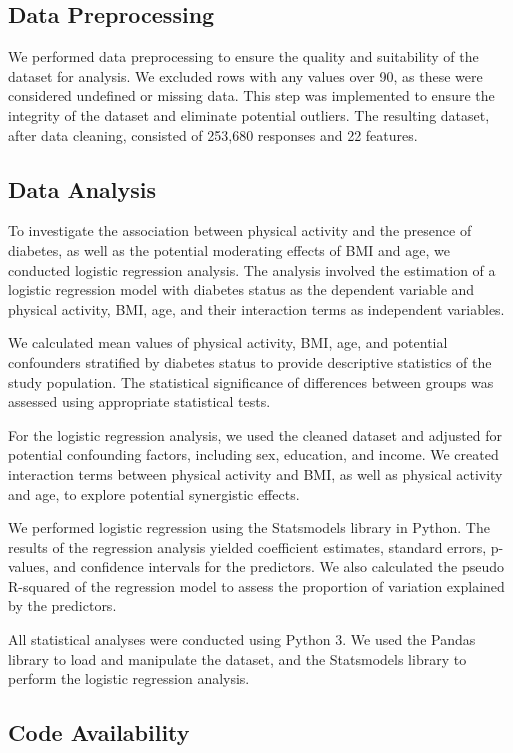 \documentclass[11pt]{article}
\begin{document}
\subsection*{Data Preprocessing}
We performed data preprocessing to ensure the quality and suitability of the dataset for analysis. We excluded rows with any values over 90, as these were considered undefined or missing data. This step was implemented to ensure the integrity of the dataset and eliminate potential outliers. The resulting dataset, after data cleaning, consisted of 253,680 responses and 22 features.

\subsection*{Data Analysis}
To investigate the association between physical activity and the presence of diabetes, as well as the potential moderating effects of BMI and age, we conducted logistic regression analysis. The analysis involved the estimation of a logistic regression model with diabetes status as the dependent variable and physical activity, BMI, age, and their interaction terms as independent variables.

We calculated mean values of physical activity, BMI, age, and potential confounders stratified by diabetes status to provide descriptive statistics of the study population. The statistical significance of differences between groups was assessed using appropriate statistical tests.

For the logistic regression analysis, we used the cleaned dataset and adjusted for potential confounding factors, including sex, education, and income. We created interaction terms between physical activity and BMI, as well as physical activity and age, to explore potential synergistic effects.

We performed logistic regression using the Statsmodels library in Python. The results of the regression analysis yielded coefficient estimates, standard errors, p-values, and confidence intervals for the predictors. We also calculated the pseudo R-squared of the regression model to assess the proportion of variation explained by the predictors.

All statistical analyses were conducted using Python 3. We used the Pandas library to load and manipulate the dataset, and the Statsmodels library to perform the logistic regression analysis.\subsection*{Code Availability}
\end{document}
